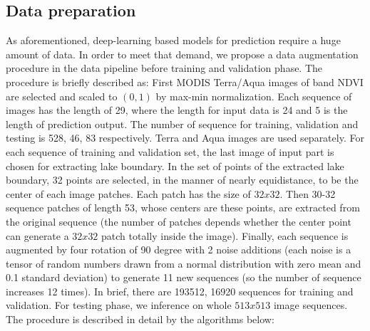 \subsection{Data preparation}
As aforementioned, deep-learning based models for prediction require a huge amount of data. In order to meet that demand, we propose a data augmentation procedure in the data pipeline before training and validation phase. The procedure is briefly described as: First MODIS Terra/Aqua images of band NDVI are selected and scaled to $(0,1)$ by max-min normalization. Each sequence of images has the length of 29, where the length for input data is 24 and 5 is the length of prediction output. The number of sequence for training, validation and testing is 528, 46, 83 respectively. Terra and Aqua images are used separately. For each sequence of training and validation set, the last image of input part is chosen for extracting lake boundary. In the set of points of the extracted lake boundary, 32 points are selected, in the manner of nearly equidistance, to be the center of each image patches. Each patch has the size of $32 { x } 32$. Then 30-32 sequence patches of length 53, whose centers are these points, are extracted from the original sequence (the number of patches depends whether the center point can generate a $32 { x } 32$ patch totally inside the image). Finally, each sequence is augmented by four rotation of 90 degree with 2 noise additions (each noise is a tensor of random numbers drawn from a normal distribution with zero mean and 0.1 standard deviation) to generate 11 new sequences (so the number of sequence increases 12 times). In brief, there are 193512, 16920 sequences for training and validation. For testing phase, we inference on whole $513 { x } 513$ image sequences. The procedure is described in detail by the algorithms below:

